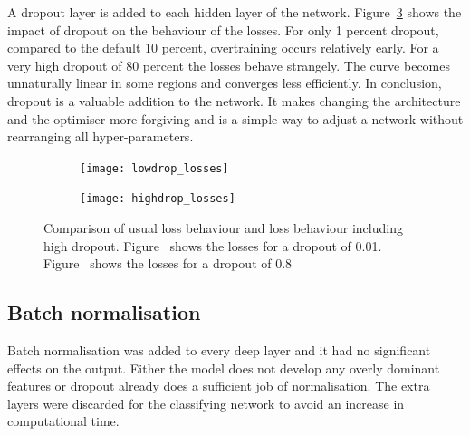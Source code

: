 A dropout layer is added to each hidden layer of the network.
Figure~\ref{fig:simple_dropout} shows the impact of dropout on the behaviour of the losses. For only \num{1} percent dropout, compared to the default \num{10} percent, overtraining occurs relatively early. For a very high dropout of \num{80} percent the losses behave strangely. The curve becomes unnaturally linear in some regions and converges less efficiently. In conclusion, dropout is a valuable addition to the network. It makes changing the architecture and the optimiser more forgiving and is a simple way to adjust a network without rearranging all hyper-parameters.

\begin{figure}[htbp]
    \centering
    \begin{subfigure}[b]{0.45\textwidth}
        \texttt{[image: lowdrop\_losses]}
        \caption{}
        \label{fig:dropout:low}
    \end{subfigure}
\quad
    \begin{subfigure}[b]{0.45\textwidth}
        \texttt{[image: highdrop\_losses]}
        \caption{}
        \label{fig:dropout:high}
    \end{subfigure}
    \caption[Performance of the classifier for different dropout percentages]{Comparison of usual loss behaviour and loss behaviour including high dropout. Figure~ shows the losses for a dropout of \num{0.01}. Figure~ shows the losses for a dropout of \num{0.8}}
	\label{fig:simple_dropout}
\end{figure}


\subsection{Batch normalisation}

Batch normalisation was added to every deep layer and it had no significant effects on the output. Either the model does not develop any overly dominant features or dropout already does a sufficient job of normalisation. The extra layers were discarded for the classifying network to avoid an increase in computational time.
